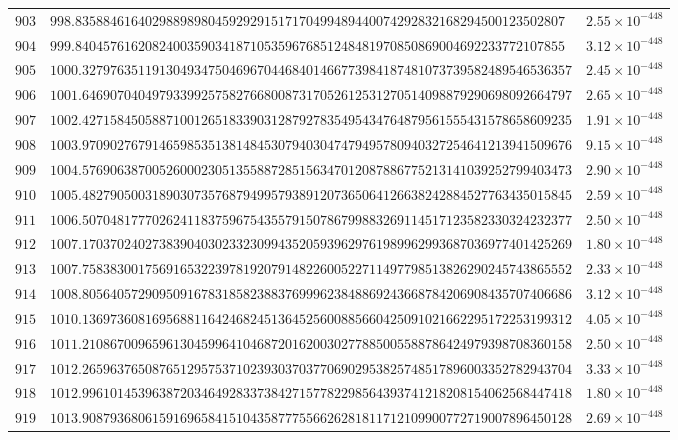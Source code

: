 \documentclass[12pt,reqno]{amsart}
\theoremstyle{remark}
\begin{document}
\begin{longtable}{clc}
$903$ & $998.8358846164029889898045929291517170499489440074292832168294500123502807$ & $2.55\times 10^{-448}$ \\
$904$ & $999.8404576162082400359034187105359676851248481970850869004692233772107855$ & $3.12\times 10^{-448}$ \\
$905$ & $1000.3279763511913049347504696704468401466773984187481073739582489546536357$ & $2.45\times 10^{-448}$ \\
$906$ & $1001.6469070404979339925758276680087317052612531270514098879290698092664797$ & $2.65\times 10^{-448}$ \\
$907$ & $1002.4271584505887100126518339031287927835495434764879561555431578658609235$ & $1.91\times 10^{-448}$ \\
$908$ & $1003.9709027679146598535138148453079403047479495780940327254641213941509676$ & $9.15\times 10^{-448}$ \\
$909$ & $1004.5769063870052600023051355887285156347012087886775213141039252799403473$ & $2.90\times 10^{-448}$ \\
$910$ & $1005.4827905003189030735768794995793891207365064126638242884527763435015845$ & $2.59\times 10^{-448}$ \\
$911$ & $1006.5070481777026241183759675435579150786799883269114517123582330324232377$ & $2.50\times 10^{-448}$ \\
$912$ & $1007.1703702402738390403023323099435205939629761989962993687036977401425269$ & $1.80\times 10^{-448}$ \\
$913$ & $1007.7583830017569165322397819207914822600522711497798513826290245743865552$ & $2.33\times 10^{-448}$ \\
$914$ & $1008.8056405729095091678318582388376999623848869243668784206908435707406686$ & $3.12\times 10^{-448}$ \\
$915$ & $1010.1369736081695688116424682451364525600885660425091021662295172253199312$ & $4.05\times 10^{-448}$ \\
$916$ & $1011.2108670096596130459964104687201620030277885005588786424979398708360158$ & $2.50\times 10^{-448}$ \\
$917$ & $1012.2659637650876512957537102393037037706902953825748517896003352782943704$ & $3.33\times 10^{-448}$ \\
$918$ & $1012.9961014539638720346492833738427157782298564393741218208154062568447418$ & $1.80\times 10^{-448}$ \\
$919$ & $1013.9087936806159169658415104358777556626281811712109900772719007896450128$ & $2.69\times 10^{-448}$ \\

\end{longtable}
\end{document}

